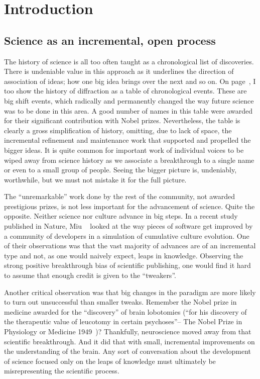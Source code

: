 \chapter{Introduction}

\section{Science as an incremental, open process}

The history of science is all too often taught as a chronological list of discoveries. There is undeniable value in this approach as it underlines the direction of association of ideas; how one big idea brings over the next and so on. On page~\pageref{table:historyDiff}, I too show the history of diffraction as a table of chronological events. These are big shift events, which radically and permanently changed the way future science was to be done in this area. A good number of names in this table were awarded for their significant contribution with Nobel prizes. Nevertheless, the table is clearly a gross simplification of history, omitting, due to lack of space, the incremental refinement and maintenance work that supported and propelled the bigger ideas. It is quite common for important work of individual voices to be wiped away from science history as we associate a breakthrough to a single name or even to a small group of people. Seeing the bigger picture is, undeniably, worthwhile, but we must not mistake it for the full picture.

The ``unremarkable'' work done by the rest of the community, not awarded prestigious prizes, is not less important for the advancement of science. Quite the opposite. Neither science nor culture advance in big steps. In a recent study published in Nature, Miu \etal~\cite{Miu2018} looked at the way pieces of software get improved by a community of developers in a simulation of cumulative culture evolution. One of their observations was that the vast majority of advances are of an incremental type and not, as one would naively expect, leaps in knowledge. Observing the strong positive breakthrough bias of scientific publishing, one would find it hard to assume that enough credit is given to the ``tweakers''. 

Another critical observation was that big changes in the paradigm are more likely to turn out unsuccessful than smaller tweaks. Remember the Nobel prize in medicine awarded for the ``discovery'' of brain lobotomies (``for his discovery of the therapeutic value of leucotomy in certain psychoses''-- The Nobel Prize in Physiology or Medicine 1949~\cite{Nobel49})? Thankfully, neuroscience moved away from that scientific breakthrough. And it did that with small, incremental improvements on the understanding of the brain. Any sort of conversation about the development of science focused only on the leaps of knowledge must ultimately be misrepresenting the scientific process.


